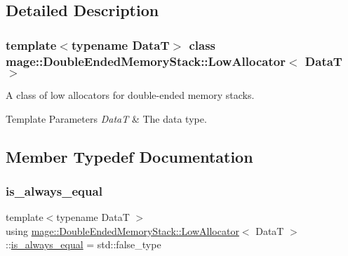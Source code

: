 \subsection{Detailed Description}
\subsubsection*{template$<$typename DataT$>$\newline
class mage\+::\+Double\+Ended\+Memory\+Stack\+::\+Low\+Allocator$<$ Data\+T $>$}

A class of low allocators for double-\/ended memory stacks.


\begin{DoxyTemplParams}{Template Parameters}
{\em DataT} & The data type. \\
\hline
\end{DoxyTemplParams}


\subsection{Member Typedef Documentation}
\hypertarget{classmage_1_1_double_ended_memory_stack_1_1_low_allocator_a376248a384b398529bd888e18778e777}{}\label{classmage_1_1_double_ended_memory_stack_1_1_low_allocator_a376248a384b398529bd888e18778e777} 
\subsubsection{\texorpdfstring{is\+\_\+always\+\_\+equal}{is\_always\_equal}}
{\footnotesize\ttfamily template$<$typename DataT $>$ \\
using \hyperlink{classmage_1_1_double_ended_memory_stack_1_1_low_allocator}{mage\+::\+Double\+Ended\+Memory\+Stack\+::\+Low\+Allocator}$<$ DataT $>$\+::\hyperlink{classmage_1_1_double_ended_memory_stack_1_1_low_allocator_a376248a384b398529bd888e18778e777}{is\+\_\+always\+\_\+equal} =  std\+::false\+\_\+type}

\hypertarget{classmage_1_1_double_ended_memory_stack_1_1_low_allocator_aa74eb72275d390ec7b1169602b338c5d}{}\label{classmage_1_1_double_ended_memory_stack_1_1_low_allocator_aa74eb72275d390ec7b1169602b338c5d} 
